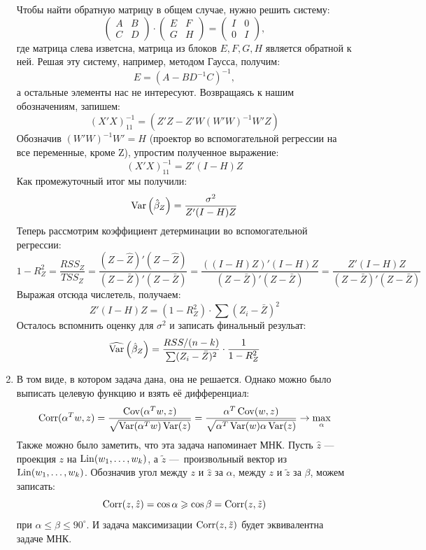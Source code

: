 \begin{enumerate}
Чтобы найти обратную матрицу в общем случае, нужно решить систему:
\[
\begin{pmatrix}
A & B \\
C & D
\end{pmatrix}
\cdot
\begin{pmatrix}
E & F \\
G & H
\end{pmatrix}
=
\begin{pmatrix}
I & 0 \\
0 & I
\end{pmatrix},
\]
где матрица слева изветсна, матрица из блоков $E, F, G, H$ является обратной к ней.
Решая эту систему, например, методом Гаусса, получим:
\[
E = (A-BD^{-1}C)^{-1},
\]
а остальные элементы нас не интересуют.
Возвращаясь к нашим обозначениям, запишем:
\[
(X'X)^{-1}_{11} = \left(Z'Z - Z'W \left(W'W \right)^{-1} W'Z \right)
\]
Обозначив $\left(W'W \right)^{-1} W'= H$ (проектор во вспомогательной регрессии на все
переменные, кроме Z), упростим полученное выражение:
\[
(X'X)^{-1}_{11} = Z'(I-H)Z
\]
Как промежуточный итог мы получили:
\[
\operatorname{Var}\left(\hat{\beta}_{Z} \right) = \frac{\sigma^2}{Z'(I-H)Z}
\]
Теперь рассмотрим коэффициент детерминации во вспомогательной регрессии:
\[
1 - R^2_Z = \frac{RSS_Z}{TSS_Z} = \frac{(Z - \hat Z)'(Z - \hat Z)}{(Z - \bar Z)'(Z - \bar Z)} = \frac{((I-H)Z)'(I-H)Z}{(Z - \bar Z)'(Z - \bar Z)}
= \frac{Z'(I-H)Z}{(Z - \bar Z)'(Z - \bar Z)}
\]
Выражая отсюда числетель, получаем:
\[
Z'(I-H)Z = \left( 1 - R^2_Z \right) \cdot \sum (Z_i - \bar Z)^2
\]
Осталось вспомнить оценку для $\sigma^2$ и записать финальный резульат:
\[
\widehat{\operatorname{Var}}\left(\hat{\beta}_{Z} \right) = \frac{RSS/(n-k)}{\sum (Z_i - \bar Z)^2} \cdot \frac{1}{1 - R^2_Z}
\]

\item В том виде, в котором задача дана, она не решается.
Однако можно было выписать целевую функцию и взять её дифференциал:
\[
\operatorname{Corr}(\alpha^T w, z) = \frac{\operatorname{Cov}(\alpha^T w, z)}{\sqrt{\operatorname{Var}(\alpha^T w)\operatorname{Var}(z)}}
= \frac{\alpha^T \operatorname{Cov}(w,z)}{\sqrt{\alpha^T\operatorname{Var}(w) \alpha \operatorname{Var}(z)}} \to \max_{\alpha}
\]
Также можно было заметить, что эта задача напоминает МНК.
Пусть $\hat z$ — проекция $z$ на $\operatorname{Lin}(w_1, \ldots, w_k)$,
а $\tilde{z}$ — произвольный вектор из $\operatorname{Lin}(w_1, \ldots, w_k)$.
Обозначив угол между $z$ и $\hat z$ за $\alpha$, между $z$ и $\tilde z$ за $\beta$,
можем записать:
\[
\operatorname{Corr}(z, \hat z) = \cos \alpha \geqslant \cos \beta = \operatorname{Corr}(z, \tilde z)
\]
при $\alpha \leq \beta \leq 90^{\circ}$.
И задача максимизации $\operatorname{Corr}(z, \tilde z)$ будет эквивалентна задаче МНК.


\end{enumerate}
